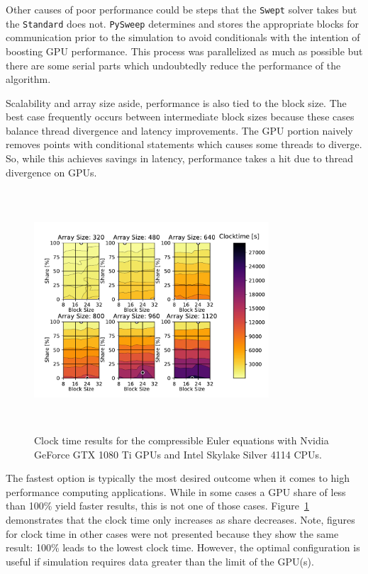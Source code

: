 \documentclass[preprints,article,accept,moreauthors,pdftex]{Definitions/mdpi}
\def\pysweep{\texttt{PySweep}}
\def\Swept{\texttt{Swept}}
\def\Standard{\texttt{Standard}}
\def\oldCPU{Intel Skylake Silver 4114} %
\def\oldGPU{Nvidia GeForce GTX 1080 Ti}
\begin{document}
Other causes of poor performance could be steps that the \Swept{} solver takes but the \Standard{} does not. \pysweep{} determines and stores the appropriate blocks for communication prior to the simulation to avoid conditionals with the intention of boosting GPU performance. This process was parallelized as much as possible but there are some serial parts which undoubtedly reduce the performance of the algorithm. 

Scalability and array size aside, performance is also tied to the block size. The best case frequently occurs between intermediate block sizes because these cases balance thread divergence and latency improvements. The GPU portion naively removes points with conditional statements which causes some threads to diverge. 
So, while this achieves savings in latency, performance takes a hit due to thread divergence on GPUs.

\begin{figure}[htbp]
    \centering
    \includegraphics[height=9cm,width=0.78\textwidth, trim={0.5cm 0.4cm 0.5cm 0.2cm},clip]{figs/clockTimeSwepteulerOld.pdf}
    \caption{Clock time results  for the compressible Euler equations with \oldGPU{} GPUs and \oldCPU{} CPUs.}
    \label{fig:clocktimeOldEuler}
\end{figure}

The fastest option is typically the most desired outcome when it comes to high performance computing applications. While in some cases a GPU share of less than 100\% yield faster results, this is not one of those cases. Figure~\ref{fig:clocktimeOldEuler} demonstrates that the clock time only increases as share decreases. Note, figures for clock time in other cases were not presented because they show the same result: 100\% leads to the lowest clock time. 
However, the optimal configuration is useful if simulation requires data greater than the limit of the GPU(s).
\end{document}
